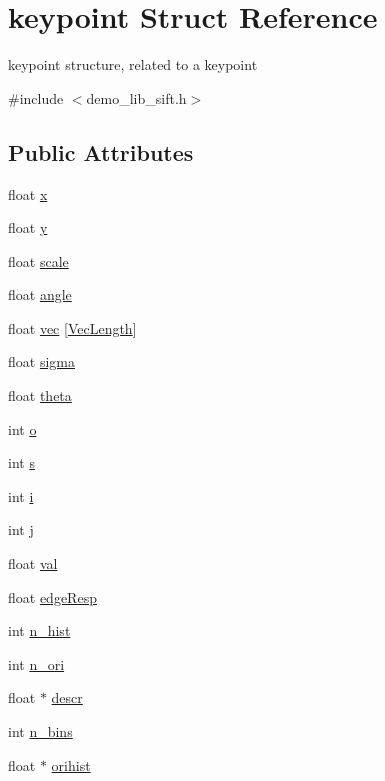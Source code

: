 \hypertarget{structkeypoint}{}\section{keypoint Struct Reference}
\label{structkeypoint}


keypoint structure, related to a keypoint  




{\ttfamily \#include $<$demo\+\_\+lib\+\_\+sift.\+h$>$}

\subsection*{Public Attributes}
\begin{DoxyCompactItemize}
\item 
float \hyperlink{structkeypoint_a139d95b51c24bc6c30bf36a726867454}{x}
\item 
float \hyperlink{structkeypoint_a8e27752a285c5360e01a6d9964870c51}{y}
\item 
float \hyperlink{structkeypoint_a5cd322f1a3dbc35a2aae60a67f27b29b}{scale}
\item 
float \hyperlink{structkeypoint_a0b7769f18cfb22ef2f1f0080e94766a2}{angle}
\item 
float \hyperlink{structkeypoint_ac5ba20aa7090315603582ee5fb110630}{vec} \mbox{[}\hyperlink{demo__lib__sift_8h_a260696a4c14b7bf151c6e8d23289fa78}{Vec\+Length}\mbox{]}
\item 
float \hyperlink{structkeypoint_af0dcb353fbd5b6e40fa539abe044e55b}{sigma}
\item 
float \hyperlink{structkeypoint_a635fa1860cb47a600284621633137ab7}{theta}
\item 
int \hyperlink{structkeypoint_a88cae4c4ce3dcea464fde7cf8b9a4c43}{o}
\item 
int \hyperlink{structkeypoint_afa34486b9d1740a093b2798883aff45c}{s}
\item 
int \hyperlink{structkeypoint_ad7b1c8ac0d3ca4d18c5fd749661c0247}{i}
\item 
int \hyperlink{structkeypoint_aefbddee300af560947f4c370ebabf72a}{j}
\item 
float \hyperlink{structkeypoint_aa33e339a04ae2d3c1b8b0d85d6823665}{val}
\item 
float \hyperlink{structkeypoint_a6d0bf466b67b0757e092a752bb55df6d}{edge\+Resp}
\item 
int \hyperlink{structkeypoint_a68c87c0de77436fe83dc6b0851898184}{n\+\_\+hist}
\item 
int \hyperlink{structkeypoint_aac06b6e82dfe31e346de0aae5e611153}{n\+\_\+ori}
\item 
float $\ast$ \hyperlink{structkeypoint_a6351f2037074aaa034a806d4b4aabd7d}{descr}
\item 
int \hyperlink{structkeypoint_a6a60f97d3c6c9baafebc032d17941a4f}{n\+\_\+bins}
\item 
float $\ast$ \hyperlink{structkeypoint_abb24c45369a83b1dd07a974de422bfd7}{orihist}
\end{DoxyCompactItemize}



